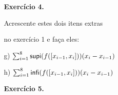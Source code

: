 \documentclass[oneside,12pt]{article}
\begin{document}
\newpage

%                                                  

{\bf Exercício 4.}

Acrescente estes dois itens extras

no exercício 1 e faça eles:

\bsk

\def\sumo{\sum_{i=1}^{8}}
\def\sumoo#1{\sumo #1 (x_i - x_{i-1})}

g) $\sumoo{\supi(f([x_{i-1},x_i]))}$

\msk

h) $\sumoo{\infi(f([x_{i-1},x_i]))}$


\newpage


{\bf Exercício 5.}
\end{document}
